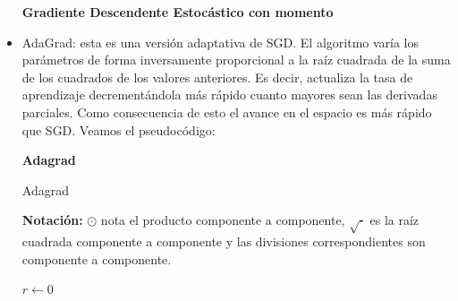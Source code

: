 \begin{itemize}
\begin{algorithm}[H]{\Large{\textbf{Gradiente Descendente Estocástico con momento}}}
		\vspace{10px}
		
		
		\vspace{10px}
		
		
		\vspace{5px}
	\end{algorithm}

	\item AdaGrad: esta es una versión adaptativa de SGD. El algoritmo varía los parámetros de forma inversamente proporcional a la raíz cuadrada de la suma de los cuadrados de los valores anteriores. Es decir, actualiza la tasa de aprendizaje decrementándola más rápido cuanto mayores sean las derivadas parciales. Como consecuencia de esto el avance en el espacio es más rápido que SGD. Veamos el pseudocódigo:
	
	\begin{algorithm}[H]{\Large{\textbf{Adagrad}}}
		
		\vspace{15px}
		
		\caption{Adagrad}
		\label{alg:adagrad}
		\textbf{Notación:} $\odot$ nota el producto componente a componente, $\sqrt{\cdot}$ es la raíz cuadrada componente a componente y las divisiones correspondientes son componente a componente.
		
		
		\vspace{10px}
		
		$r\leftarrow 0$
		

\end{algorithm}
\end{itemize}
